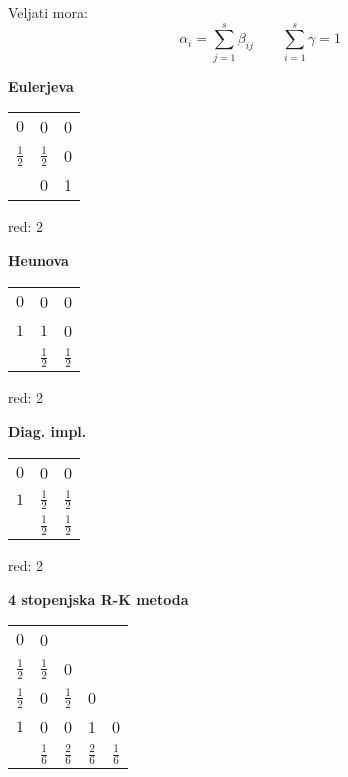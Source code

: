 \begin{multicols}{5}
\begin{center}
\begin{tabular}[]{c | c c c}
    \end{tabular}
\end{center}
Veljati mora:
\[\alpha_i = \sum_{j=1}^{s} \beta_{ij} \qquad \sum_{i=1}^s \gamma = 1\]

\begin{multicols*}{3}
    
    \textbf{Eulerjeva}
    \begin{center}
        \renewcommand{\arraystretch}{1.5}
        \begin{tabular}[]{c | c c}
            $0$ & 0 & 0 \\
            $\frac{1}{2}$ & $\frac{1}{2}$ & 0 \\ \hline
            & 0 & 1 \\
            
        \end{tabular}
    \end{center}
    red: 2

    \textbf{Heunova}
    \begin{center}
        \renewcommand{\arraystretch}{1.5}
        \begin{tabular}[]{c | c c}
            $0$ & 0 & 0 \\
            $1$ & $1$ & 0 \\ \hline
            & $\frac{1}{2}$ & $\frac{1}{2}$ \\
            
        \end{tabular}
    \end{center}
    red: 2
    
    \textbf{Diag. impl.}
    \begin{center}
        \renewcommand{\arraystretch}{1.5}
        \begin{tabular}[]{c | c c}
            $0$ & 0 & 0 \\
            $1$ & $\frac{1}{2}$ & $\frac{1}{2}$ \\ \hline
            & $\frac{1}{2}$ & $\frac{1}{2}$ \\
            
        \end{tabular}
    \end{center}
    red: 2
\end{multicols*}

\textbf{4 stopenjska R-K metoda}
\begin{center}
    \renewcommand{\arraystretch}{1.5}
    \begin{tabular}[]{c | c c c c}
        $0$ & 0 &  &  &  \\
        $\frac{1}{2}$ & $\frac{1}{2}$  & 0 &  &  \\
        $\frac{1}{2}$ & 0  & $\frac{1}{2}$  & 0 &  \\
        $1$ & 0  & 0  & 1 & 0 \\ \hline
                 & $\frac{1}{6}$ & $\frac{2}{6}$ & $\frac{2}{6}$ & $\frac{1}{6}$ \\


\end{tabular}
\end{center}
\end{multicols}
